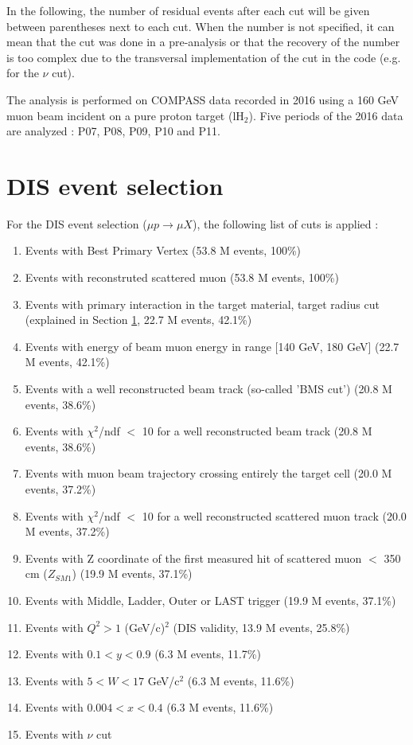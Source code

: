 In the following, the number of residual events after each cut will be given between parentheses next to each cut.
When the number is not specified, it can mean that the cut was done in a pre-analysis or that the recovery of the number is too complex due to the transversal implementation of the cut in the code (e.g. for the $\nu$ cut).

The analysis is performed on COMPASS data recorded in 2016 using a 160 GeV muon beam incident on a pure proton target (lH$_2$).
Five periods of the 2016 data are analyzed : P07, P08, P09, P10 and P11.


\section{DIS event selection}

For the DIS event selection ($\mu p \rightarrow \mu X$), the following list of cuts is applied :
\begin{enumerate}
  \item Events with Best Primary Vertex (53.8 M events, 100\%)
  \item Events with reconstruted scattered muon (53.8 M events, 100\%)
  \item Events with primary interaction in the target material, target radius cut (explained in Section \ref{}, 22.7 M events, 42.1\%)
  \item Events with energy of beam muon energy in range [140 GeV, 180 GeV] (22.7 M events, 42.1\%)
  \item Events with a well reconstructed beam track (so-called 'BMS cut') (20.8 M events, 38.6\%)
  \item Events with $\chi^2$/ndf $<$ 10 for a well reconstructed beam track (20.8 M events, 38.6\%)
  \item Events with muon beam trajectory crossing entirely the target cell (20.0 M events, 37.2\%)
  \item Events with $\chi^2$/ndf $<$ 10 for a well reconstructed scattered muon track (20.0 M events, 37.2\%)
  \item Events with Z coordinate of the first measured hit of scattered muon $<$ 350 cm ($Z_{SM1}$) (19.9 M events, 37.1\%)
  \item Events with Middle, Ladder, Outer or LAST trigger (19.9 M events, 37.1\%)
  \item Events with $Q^2>1$ (GeV/c)$^2$ (DIS validity, 13.9 M events, 25.8\%)
  \item Events with $0.1 < y < 0.9$ (6.3 M events, 11.7\%)
  \item Events with $5 < W < 17$ GeV/c$^2$ (6.3 M events, 11.6\%)
  \item Events with $0.004 < x < 0.4$ (6.3 M events, 11.6\%)
  \item Events with $\nu$ cut
\end{enumerate}

